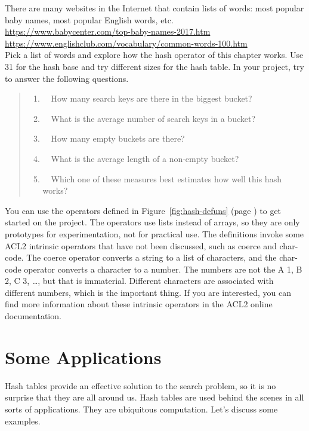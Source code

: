 \begin{ExerciseList}
\Exercise There are many websites in the Internet that contain lists of words:
most popular baby names, most popular English words, etc.\\
\hspace*{1cm}\url{https://www.babycenter.com/top-baby-names-2017.htm} \\
\hspace*{1cm}\url{https://www.englishclub.com/vocabulary/common-words-100.htm}\\
Pick a list of words and explore how the hash operator of this chapter works.
Use 31 for the hash base and try different sizes for the hash table.
In your project, try to answer the following questions.
\begin{quote}
\begin{enumerate}
\item ~~How many search keys are there in the biggest bucket?
\item ~~What is the average number of search keys in a bucket?
\item ~~How many empty buckets are there?
\item ~~What is the average length of a non-empty bucket?
\item ~~Which one of these measures best estimates how well this hash works?
\end{enumerate}
\end{quote}
You can use the operators defined in
Figure~\ref{fig:hash-defuns} (page \pageref{fig:hash-defuns})
to get started on the project.
The operators use lists instead of arrays, so they are only  prototypes
for experimentation, not for practical use.
The definitions invoke some ACL2 intrinsic operators
that have not been discussed, such as
\textsf{coerce} and \textsf{char-code}.
The \textsf{coerce} operator converts a string to a list of characters,
and the char-code operator converts a character to a number.
The numbers are not the A 1, B 2, C 3, \dots, but that is immaterial.
Different characters are associated with different numbers,
which is the important thing. If you are interested,
you can find more information about these intrinsic
operators in the ACL2 online documentation.
\end{ExerciseList}

\section{Some Applications}

Hash tables provide an effective solution to the search problem,
so it is no surprise that they are all around us.
Hash tables are used behind the scenes in all sorts of applications.
They are ubiquitous computation.
Let's discuss some examples.

